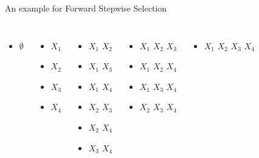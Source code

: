 \documentclass[aspectratio=169,usenames,dvipsnames]{beamer}
\begin{document}
\begin{frame}[c]{An example for Forward Stepwise Selection}

	\centering

\begin{columns}
\centering
\begin{itemize}
	\item $\emptyset$
\end{itemize}
\centering

\begin{itemize}
	\item $X_1$
	\item $X_2$
	\item $X_3$
	\item $X_4$
\end{itemize}
\centering
\begin{itemize}
	\item $X_1$ $X_2$
	\item $X_1$ $X_3$
	\item $X_1$ $X_4$
	\item $X_2$ $X_3$
	\item $X_2$ $X_4$
	\item $X_3$ $X_4$
\end{itemize}
\centering
\begin{itemize}
	\item $X_1$ $X_2$ $X_3$
	\item $X_1$ $X_2$ $X_4$
	\item $X_1$ $X_3$ $X_4$
	\item $X_2$ $X_3$ $X_4$
\end{itemize}
\centering
\begin{itemize}
	\item $X_1$ $X_2$ $X_3$ $X_4$
\end{itemize}
\end{columns}
\end{frame}
\end{document}
